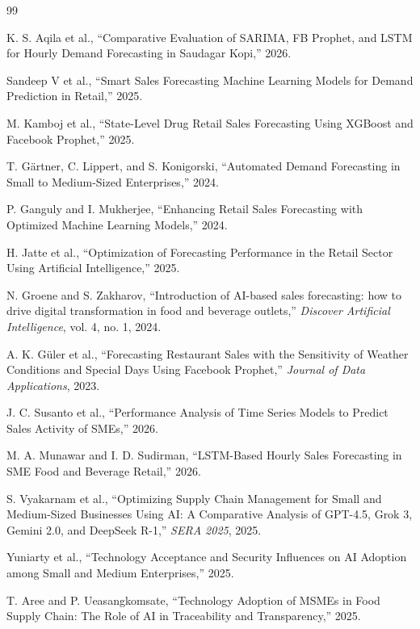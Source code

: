 \documentclass[conference]{IEEEtran}
\begin{document}
\begin{thebibliography}{99}

K. S. Aqila et al., ``Comparative Evaluation of SARIMA, FB Prophet, and LSTM for Hourly Demand Forecasting in Saudagar Kopi,'' 2026.

Sandeep V et al., ``Smart Sales Forecasting Machine Learning Models for Demand Prediction in Retail,'' 2025.

M. Kamboj et al., ``State-Level Drug Retail Sales Forecasting Using XGBoost and Facebook Prophet,'' 2025.

T. Gärtner, C. Lippert, and S. Konigorski, ``Automated Demand Forecasting in Small to Medium-Sized Enterprises,'' 2024.

P. Ganguly and I. Mukherjee, ``Enhancing Retail Sales Forecasting with Optimized Machine Learning Models,'' 2024.

H. Jatte et al., ``Optimization of Forecasting Performance in the Retail Sector Using Artificial Intelligence,'' 2025.

N. Groene and S. Zakharov, ``Introduction of AI-based sales forecasting: how to drive digital transformation in food and beverage outlets,'' \emph{Discover Artificial Intelligence}, vol. 4, no. 1, 2024.

A. K. Güler et al., ``Forecasting Restaurant Sales with the Sensitivity of Weather Conditions and Special Days Using Facebook Prophet,'' \emph{Journal of Data Applications}, 2023.

J. C. Susanto et al., ``Performance Analysis of Time Series Models to Predict Sales Activity of SMEs,'' 2026.

M. A. Munawar and I. D. Sudirman, ``LSTM-Based Hourly Sales Forecasting in SME Food and Beverage Retail,'' 2026.

S. Vyakarnam et al., ``Optimizing Supply Chain Management for Small and Medium-Sized Businesses Using AI: A Comparative Analysis of GPT-4.5, Grok 3, Gemini 2.0, and DeepSeek R-1,'' \emph{SERA 2025}, 2025.

Yuniarty et al., ``Technology Acceptance and Security Influences on AI Adoption among Small and Medium Enterprises,'' 2025.

T. Aree and P. Ueasangkomsate, ``Technology Adoption of MSMEs in Food Supply Chain: The Role of AI in Traceability and Transparency,'' 2025.


\end{thebibliography}
\end{document}
